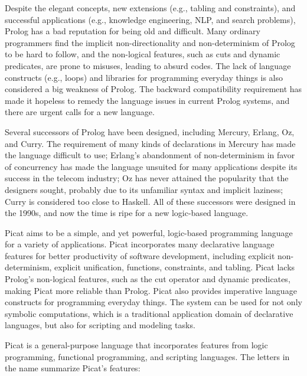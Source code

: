 Despite the elegant concepts, new extensions (e.g., tabling and constraints), and successful applications (e.g., knowledge engineering, NLP, and search problems), Prolog has a bad reputation for being old and difficult.  Many ordinary programmers find the implicit non-directionality and non-determinism of Prolog to be hard to follow, and the non-logical features, such as cuts and dynamic predicates, are prone to misuses, leading to absurd codes. The lack of language constructs (e.g., loops) and libraries for programming everyday things is also considered a big weakness of Prolog. The backward compatibility requirement has made it hopeless to remedy the language issues in current Prolog systems, and there are urgent calls for a new language.

Several successors of Prolog have been designed, including Mercury, Erlang, Oz, and Curry. The requirement of many kinds of declarations in Mercury has made the language difficult to use; Erlang's  abandonment of non-determinism in favor of concurrency has made the language unsuited for many applications despite its success in the telecom industry; Oz has never attained the popularity that the designers sought, probably due to its unfamiliar syntax and implicit laziness; Curry is considered too close to Haskell. All of these successors were designed in the 1990s, and now the time is ripe for a new logic-based language.

Picat aims to be a simple, and yet powerful, logic-based programming language for a variety of applications. Picat incorporates many declarative language features for better productivity of software development, including explicit non-determinism, explicit unification, functions, constraints, and tabling. Picat lacks Prolog's non-logical features, such as the cut operator and dynamic predicates, making Picat more reliable than Prolog. Picat also provides imperative language constructs for programming everyday things. The system can be used for not only symbolic computations, which is a traditional application domain of declarative languages, but also for scripting and modeling tasks.

Picat is a general-purpose language that incorporates features from logic programming, functional programming, and scripting languages. The letters in the name summarize Picat's features:


